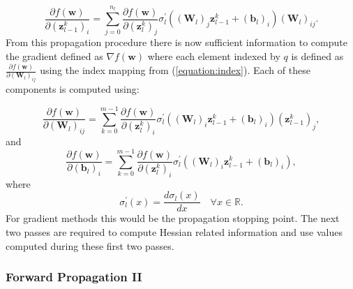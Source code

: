 \documentclass[letterpaper,12pt,titlepage,oneside,final]{book}
\begin{document}
	\begin{equation}
	\frac{\partial{f(\mathbf{w})}}{\partial{(\mathbf{z}_{l-1}^{k})_{i}}} = \sum_{j=0}^{n_{l}}{\frac{\partial{f(\mathbf{w})}}{\partial{(\mathbf{z}_{l}^{k})_{j}}}\sigma_{l}^{\prime}((\mathbf{W}_{l})_{j}\mathbf{z}_{l-1}^{k} + (\mathbf{b}_{l})_{i})(\mathbf{W}_{l})_{ij}}.
	\label{equation:pass2_pe}
	\end{equation}
	From this propagation procedure there is now sufficient information to compute the gradient defined as $\nabla{f(\mathbf{w})}$ where each element indexed by $q$ is defined as $\frac{\partial{f(\mathbf{w})}}{\partial{(\mathbf{W}_{l})_{ij}}}$ using the index mapping from (\ref{equation:index}). Each of these components is computed using:
	
	\begin{equation}
	\frac{\partial{f(\mathbf{w})}}{\partial{(\mathbf{W}_{l})_{ij}}} = \sum_{k=0}^{m-1}{\frac{\partial{f(\mathbf{w})}}{\partial{(\mathbf{z}_{l}^{k})_{i}}}\sigma_{l}^{\prime}((\mathbf{W}_{l})_{i}\mathbf{z}_{l-1}^{k}+ (\mathbf{b}_{l})_{i})(\mathbf{z}^{k}_{l-1})_{j}},
	\label{equation:grad_w}
	\end{equation}
	and
	\begin{equation}
	\frac{\partial{f(\mathbf{w})}}{\partial{(\mathbf{b}_{l})_{i}}} = \sum_{k=0}^{m-1}{\frac{\partial{f(\mathbf{w})}}{\partial{(\mathbf{z}_{l}^{k})_{i}}}\sigma_{l}^{\prime}((\mathbf{W}_{l})_{i}\mathbf{z}_{l-1}^{k}+ (\mathbf{b}_{l})_{i})},
	\label{equation:grad_b}
	\end{equation}
	where 
	\begin{equation}
	\sigma_{l}^{\prime}(x) = \frac{d\sigma_{l}(x)}{d x} \quad \forall x \in \mathbb{R}.
	\end{equation}
	For gradient methods this would be the propagation stopping point. The next two passes are required to compute Hessian related information and use values computed during these first two passes.
	
	
	\subsubsection{Forward Propagation II}
	
\end{document}
